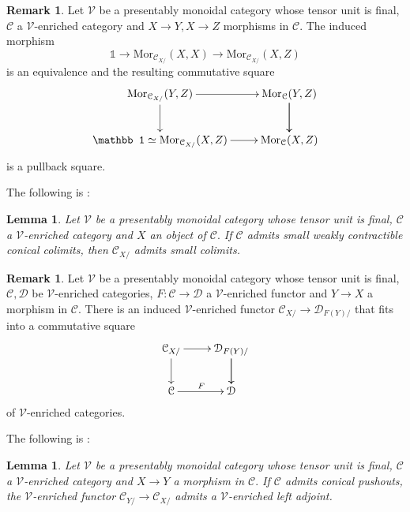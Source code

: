 \documentclass[10pt,oneside]{article}
\numberwithin{equation}{section} %
\numberwithin{figure}{section} %
\theoremstyle{plain}
\newtheorem{lemma}[theorem]{Lemma}
\theoremstyle{definition}
\newtheorem{remark}[theorem]{Remark}
\newcommand{\mC}{{\mathcal C}}
\newcommand{\mD}{{\mathcal D}}
\newcommand{\mV}{{\mathcal V}}
\newcommand{\X}{X}
\newcommand{\Y}{Y}
\newcommand{\Z}{Z}
\newcommand{\tu}{{\mathbb 1}}
\newcommand{\Mor}{{\mathrm{Mor}}}
\begin{document}
\begin{remark}\label{init}
Let $\mV$ be a presentably monoidal category whose tensor unit is final, $\mC$ a $\mV$-enriched category and $\X \to \Y, \X \to \Z$ morphisms in $\mC.$
The induced morphism $$\tu \to \Mor_{\mC_{\X/}}(\X,\X) \to \Mor_{\mC_{\X/}}(\X,\Z)$$ is an equivalence and the resulting commutative square
$$\begin{xy}
\xymatrix{
\Mor_{\mC_{\X/}}(\Y,\Z) \ar[d]^{} \ar[r]
& \Mor_{\mC}(\Y,\Z) \ar[d] \ar[d]^{}
\\ 
\tu \simeq \Mor_{\mC_{\X/}}(\X,\Z) \ar[r] & \Mor_{\mC}(\X,\Z)
}
\end{xy}$$
is a pullback square.
    
\end{remark}

The following is \cite[Lemma 2.2.3.]{oriented}:

\begin{lemma}

Let $\mV$ be a presentably monoidal category whose tensor unit is final, $\mC$ a $\mV$-enriched category and $X $ an object of $\mC.$
If $\mC$ admits small weakly contractible conical colimits, then $\mC_{\X/}$ admits small colimits.

\end{lemma}

\begin{remark}
Let $\mV$ be a presentably monoidal category whose tensor unit is final, $\mC, \mD$ be $\mV$-enriched categories, $F: \mC \to \mD$ a $\mV$-enriched functor 
and $Y \to X $ a morphism in $\mC.$
There is an induced $\mV$-enriched functor 
$\mC_{\X/} \to \mD_{F(\Y)/}$ that fits into a commutative square 
$$\begin{xy}
\xymatrix{
\mC_{\X/} \ar[d]^{} \ar[r]
&  \mD_{F(\Y)/} \ar[d] \ar[d]^{}
\\ 
\mC
\ar[r]^F & \mD
}
\end{xy}$$	
of $\mV$-enriched categories.
    
\end{remark}

The following is \cite[Lemma 2.2.5.]{oriented}:

\begin{lemma}\label{bien}
Let $\mV$ be a presentably monoidal category whose tensor unit is final, $\mC$ a $\mV$-enriched category and $X \to Y$ a morphism in $\mC.$
If $\mC$ admits conical pushouts, the $\mV$-enriched functor $\mC_{\Y/} \to \mC_{\X/}$ admits a $\mV$-enriched left adjoint.
	
\end{lemma}
\end{document}
